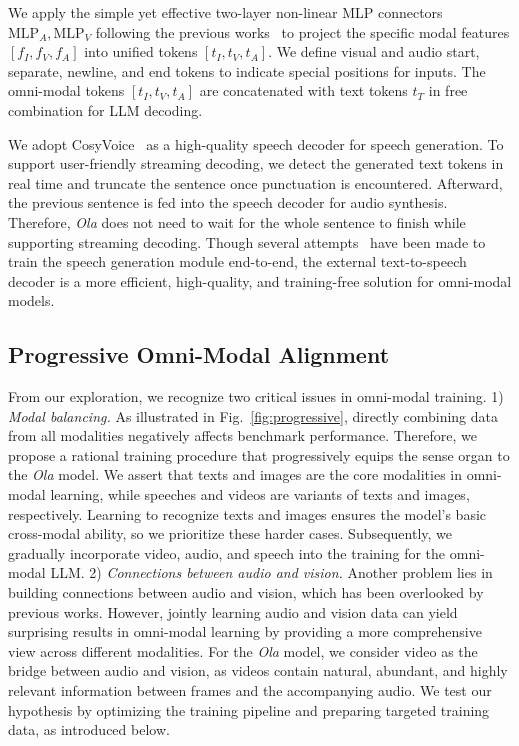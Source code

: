 We apply the simple yet effective two-layer non-linear MLP connectors $\text{MLP}_{A},\text{MLP}_{V}$ following the previous works~\citep{liu2024llava,liu2024llava15} to project the specific modal features $[f_I,f_V,f_A]$ into unified tokens $[t_I,t_V,t_A]$. We define visual and audio start, separate, newline, and end tokens to indicate special positions for inputs. The omni-modal tokens $[t_I,t_V,t_A]$ are concatenated with text tokens $t_T$ in free combination for LLM decoding. 

We adopt CosyVoice~\citep{du2024cosyvoice} as a high-quality speech decoder for speech generation. To support user-friendly streaming decoding, we detect the generated text tokens in real time and truncate the sentence once punctuation is encountered. Afterward, the previous sentence is fed into the speech decoder for audio synthesis. Therefore, \textit{Ola} does not need to wait for the whole sentence to finish while supporting streaming decoding. Though several attempts~\citep{fang2024llamaomni,xie2024miniomni2} have been made to train the speech generation module end-to-end, the external text-to-speech decoder is a more efficient, high-quality, and training-free solution for omni-modal models.

\subsection{Progressive Omni-Modal Alignment} \label{sec:method_train}

From our exploration, we recognize two critical issues in omni-modal training. 1) \textit{Modal balancing.} As illustrated in Fig.~\ref{fig:progressive}, directly combining data from all modalities negatively affects benchmark performance. Therefore, we propose a rational training procedure that progressively equips the sense organ to the \textit{Ola} model. We assert that texts and images are the core modalities in omni-modal learning, while speeches and videos are variants of texts and images, respectively. Learning to recognize texts and images ensures the model's basic cross-modal ability, so we prioritize these harder cases. Subsequently, we gradually incorporate video, audio, and speech into the training for the omni-modal LLM. 2) \textit{Connections between audio and vision. } Another problem lies in building connections between audio and vision, which has been overlooked by previous works. However, jointly learning audio and vision data can yield surprising results in omni-modal learning by providing a more comprehensive view across different modalities. For the \textit{Ola} model, we consider video as the bridge between audio and vision, as videos contain natural, abundant, and highly relevant information between frames and the accompanying audio. We test our hypothesis by optimizing the training pipeline and preparing targeted training data, as introduced below.

